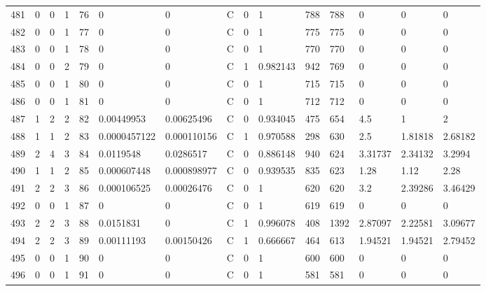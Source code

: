 \begin{latin}
\begin{longtable}{lllllllllllllll}
	481 & 0  & 0   & 1  & 76  & 0              & 0              & C & 0  & 1        & 788  & 788  & 0       & 0       & 0       \\
	482 & 0  & 0   & 1  & 77  & 0              & 0              & C & 0  & 1        & 775  & 775  & 0       & 0       & 0       \\
	483 & 0  & 0   & 1  & 78  & 0              & 0              & C & 0  & 1        & 770  & 770  & 0       & 0       & 0       \\
	484 & 0  & 0   & 2  & 79  & 0              & 0              & C & 1  & 0.982143 & 942  & 769  & 0       & 0       & 0       \\
	485 & 0  & 0   & 1  & 80  & 0              & 0              & C & 0  & 1        & 715  & 715  & 0       & 0       & 0       \\
	486 & 0  & 0   & 1  & 81  & 0              & 0              & C & 0  & 1        & 712  & 712  & 0       & 0       & 0       \\
	487 & 1  & 2   & 2  & 82  & 0.00449953     & 0.00625496     & C & 0  & 0.934045 & 475  & 654  & 4.5     & 1       & 2       \\
	488 & 1  & 1   & 2  & 83  & 0.0000457122   & 0.000110156    & C & 1  & 0.970588 & 298  & 630  & 2.5     & 1.81818 & 2.68182 \\
	489 & 2  & 4   & 3  & 84  & 0.0119548      & 0.0286517      & C & 0  & 0.886148 & 940  & 624  & 3.31737 & 2.34132 & 3.2994  \\
	490 & 1  & 1   & 2  & 85  & 0.000607448    & 0.000898977    & C & 0  & 0.939535 & 835  & 623  & 1.28    & 1.12    & 2.28    \\
	491 & 2  & 2   & 3  & 86  & 0.000106525    & 0.00026476     & C & 0  & 1        & 620  & 620  & 3.2     & 2.39286 & 3.46429 \\
	492 & 0  & 0   & 1  & 87  & 0              & 0              & C & 0  & 1        & 619  & 619  & 0       & 0       & 0       \\
	493 & 2  & 2   & 3  & 88  & 0.0151831      & 0              & C & 1  & 0.996078 & 408  & 1392 & 2.87097 & 2.22581 & 3.09677 \\
	494 & 2  & 2   & 3  & 89  & 0.00111193     & 0.00150426     & C & 1  & 0.666667 & 464  & 613  & 1.94521 & 1.94521 & 2.79452 \\
	495 & 0  & 0   & 1  & 90  & 0              & 0              & C & 0  & 1        & 600  & 600  & 0       & 0       & 0       \\
	496 & 0  & 0   & 1  & 91  & 0              & 0              & C & 0  & 1        & 581  & 581  & 0       & 0       & 0       \\

\end{longtable}
\end{latin}
